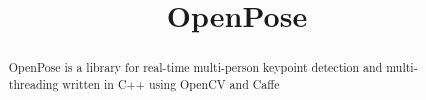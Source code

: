 \documentclass{article}
\begin{document}
\title{OpenPose}

\maketitle

\begin{abstract}
\noindent
OpenPose is a library for real-time multi-person keypoint detection and multi-threading written in C++ using OpenCV and Caffe


\end{abstract}

\setcounter{tocdepth}{2}
\tableofcontents

\newpage
\end{document}
